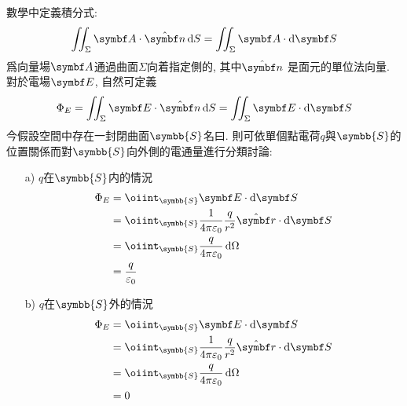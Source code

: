 \begin{solve}
\begin{itemize}
              數學中定義積分式:
              $$\iint_{\Sigma} \va{A} \cdot \vu{n} \dif S = \iint_{\Sigma} \va{A} \cdot \dif\va{S}$$
              爲向量場$\va{A}$通過曲面$\Sigma$向着指定側的, 其中$\vu{n}$ 是面元的單位法向量.
              對於電場$\va{E}$, 自然可定義
              $$\Phi_{E} = \iint_{\Sigma} \va{E} \cdot \vu{n} \dif S = \iint_{\Sigma} \va{E} \cdot \dif\va{S}$$
              今假設空間中存在一封閉曲面$\symbb{S}$名曰. 則可依單個點電荷$q$與$\symbb{S}$的位置關係而對$\symbb{S}$向外側的電通量進行分類討論:
              \columnseprule=0.4pt
              \begin{multicols}{2}
                  \begin{itemize}
                      \item[a)] $q$在$\symbb{S}$内的情況
                            \begin{align*}
                                \Phi_E & = \oiint_{\symbb{S}} \va{E} \cdot \dif \va{S}                                          \\
                                       & = \oiint_{\symbb{S}} \frac{1}{4\pi\varepsilon_0} \frac{q}{r^2} \vu{r} \cdot \dif\va{S} \\
                                       & = \oiint_{\symbb{S}} \frac{q}{4\pi\varepsilon_0} \dif\Omega                            \\
                                       & = \frac{q}{\varepsilon_0}
                            \end{align*}

                      \item[b)] $q$在$\symbb{S}$外的情況
                            \begin{align*}
                                \Phi_E & = \oiint_{\symbb{S}} \va{E} \cdot \dif \va{S}                                          \\
                                       & = \oiint_{\symbb{S}} \frac{1}{4\pi\varepsilon_0} \frac{q}{r^2} \vu{r} \cdot \dif\va{S} \\
                                       & = \oiint_{\symbb{S}} \frac{q}{4\pi\varepsilon_0} \dif\Omega                            \\
                                       & = 0
                            \end{align*}
                  \end{itemize}
              \end{multicols}


\end{itemize}
\end{solve}
